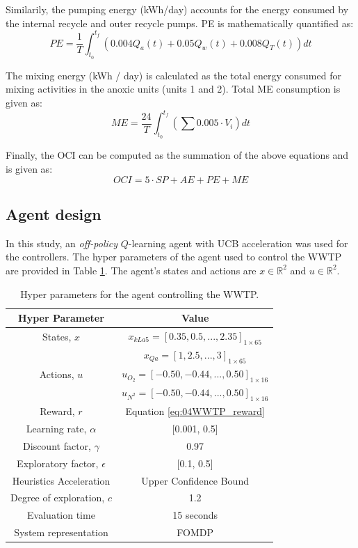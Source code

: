 Similarily, the pumping energy (kWh/day) accounts for the energy consumed by the internal recycle and outer recycle pumps.  PE is mathematically quantified as:
\begin{equation}
    PE = \frac{1}{T} \int_{t_0}^{t_f} (0.004 Q_a(t) + 0.05 Q_w(t) + 0.008 Q_T(t)) dt
\end{equation}

The mixing energy (kWh / day) is calculated as the total energy consumed for mixing activities in the anoxic units (units 1 and 2). Total ME consumption is given as:
\begin{equation}
    ME = \frac{24}{T} \int_{t_0}^{t_f} \left(\sum 0.005 \cdot V_i \right) dt
\end{equation}


Finally, the OCI can be computed as the summation of the above equations and is given as:
\begin{equation}
    OCI = 5 \cdot SP + AE + PE + ME
\end{equation}

\subsection{Agent design}
In this study, an \textit{off-policy} $Q$-learning agent with UCB acceleration was used for the controllers.  The hyper parameters of the agent used to control the WWTP are provided in Table \ref{tab:04WWTPagent}. The agent's states and actions are $x \in \mathbb{R}^2$ and $u \in \mathbb{R}^2$. 

\begin{table}[H]
\caption{Hyper parameters for the agent controlling the WWTP.}
\label{tab:04WWTPagent}
\centering
\begin{tabular}{c|c}
\textbf{Hyper Parameter}     & \textbf{Value}  \\
\hline
States, $x$	             	& $x_{kLa5} = [0.35, 0.5, ..., 2.35]_{1 \times 65} $		 \\
        	             	& $x_{Qa} = [1, 2.5, ..., 3]_{1 \times 65} $		 \\
Actions, $u$                & $u_{O_2} = [-0.50, -0.44, ..., 0.50]_{1 \times 16}$	         \\
                            & $u_{N^2} = [-0.50, -0.44, ..., 0.50]_{1 \times 16}$		\\
Reward, $r$	                & Equation \ref{eq:04WWTP_reward}		\\
Learning rate, $\alpha$		& [0.001, 0.5]		 \\
Discount factor, $\gamma$      	& 0.97  \\
Exploratory factor, $\epsilon$             & [0.1, 0.5]  \\
Heuristics Acceleration     & Upper Confidence Bound \\
Degree of exploration, $c$  & 1.2 \\
Evaluation time                 & 15 seconds \\
System representation           & FOMDP \\
\end{tabular}
\end{table}

